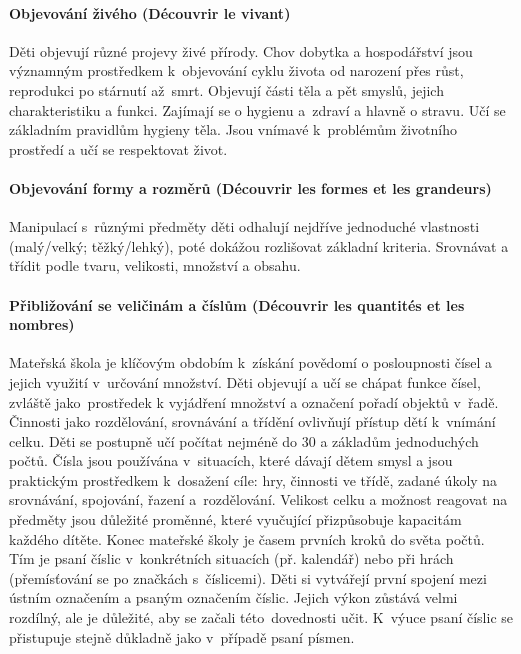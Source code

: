 			\paragraph{Objevování živého (Découvrir le vivant)} 
				Děti objevují různé projevy živé přírody. Chov dobytka a hospodářství jsou významným prostředkem k objevování cyklu života od narození přes růst, reprodukci po stárnutí až smrt.
				Objevují části těla a pět smyslů, jejich charakteristiku a funkci. Zajímají se o hygienu a zdraví a hlavně o stravu. Učí se základním pravidlům hygieny těla. 
				Jsou vnímavé k problémům životního prostředí a učí se respektovat život. 
			\paragraph{Objevování formy a rozměrů (Découvrir les formes et les grandeurs)}
				Manipulací s různými předměty děti odhalují nejdříve jednoduché vlastnosti (malý/velký; těžký/lehký), poté dokážou rozlišovat základní kriteria. Srovnávat a třídit podle tvaru, velikosti, množství a obsahu.
			\paragraph{Přibližování se veličinám a číslům (Découvrir les quantités et les nombres)}
				Mateřská škola je klíčovým obdobím k získání povědomí o posloupnosti čísel a jejich využití v určování množství. Děti objevují a učí se chápat funkce čísel, zvláště jako prostředek k vyjádření množství a označení pořadí objektů v řadě.
				Činnosti jako rozdělování, srovnávání a třídění ovlivňují přístup dětí k vnímání celku. Děti se postupně učí počítat nejméně do 30 a základům jednoduchých počtů.
				Čísla jsou používána v situacích, které dávají dětem smysl a jsou praktickým prostředkem k dosažení cíle: hry, činnosti ve třídě, zadané úkoly na srovnávání, spojování, řazení a rozdělování. Velikost celku a možnost reagovat na předměty jsou důležité proměnné, které vyučující přizpůsobuje kapacitám každého dítěte. 
				Konec mateřské školy je časem prvních kroků do světa počtů. 
				Tím je psaní číslic v konkrétních situacích (př. kalendář) nebo při hrách (přemísťování se po značkách s číslicemi). Děti si vytvářejí první spojení mezi ústním označením a psaným označením číslic. Jejich výkon zůstává velmi rozdílný, ale je důležité, aby se začali této dovednosti učit. K výuce psaní číslic se přistupuje stejně důkladně jako v případě psaní písmen.
